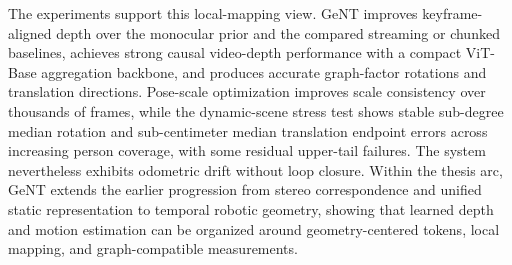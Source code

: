 The experiments support this local-mapping view.
GeNT improves keyframe-aligned depth over the monocular prior and the compared streaming or chunked baselines, achieves strong causal video-depth performance with a compact ViT-Base aggregation backbone, and produces accurate graph-factor rotations and translation directions.
Pose-scale optimization improves scale consistency over thousands of frames, while the dynamic-scene stress test shows stable sub-degree median rotation and sub-centimeter median translation endpoint errors across increasing person coverage, with some residual upper-tail failures.
The system nevertheless exhibits odometric drift without loop closure.
Within the thesis arc, GeNT extends the earlier progression from stereo correspondence and unified static representation to temporal robotic geometry, showing that learned depth and motion estimation can be organized around geometry-centered tokens, local mapping, and graph-compatible measurements.
